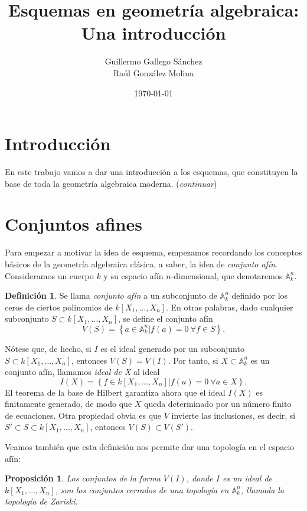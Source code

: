 \documentclass[12pt,a4paper]{article}
\title{ Esquemas en geometría algebraica: Una introducción}
\author{Guillermo Gallego Sánchez \\ Raúl González Molina}
\date{\today}
\newtheorem{prop}[thm]{Proposición}
\theoremstyle{definition} \newtheorem{defn}[thm]{Definición}
\theoremstyle{definition} \newtheorem{ejemplo}[thm]{Ejemplo}
\theoremstyle{definition} \newtheorem{ejercicio}[thm]{Ejercicio}
\theoremstyle{remark} \newtheorem*{obs}{Observación}
\def\AA{\mathbb{A}}
\begin{document}
\maketitle
\section*{Introducción}
En este trabajo vamos a dar una introducción a los esquemas, que constituyen la base de toda la geometría algebraica moderna. (\emph{continuar})
\section{Conjuntos afines}
Para empezar a motivar la idea de esquema, empezamos recordando los conceptos básicos de la geometría algebraica clásica, a saber, la idea de \emph{conjunto afín}. Consideramos un cuerpo $k$ y su espacio afín $n$-dimensional, que denotaremos $\AA_k^n$.
\begin{defn}
  Se llama \emph{conjunto afín} a un subconjunto de $\AA_k^n$ definido por los ceros de ciertos polinomios de $k[X_1,\dots,X_n]$. En otras palabras, dado cualquier subconjunto $S\subset k[X_1,\dots,X_n]$, se define el conjunto afín
  \begin{equation*}
    V(S)=\left\{ a\in \AA_k^n \vert f(a)=0 \ \forall f\in S \right\}.
  \end{equation*}
\end{defn}

Nótese que, de hecho, si $I$ es el ideal generado por un subconjunto $S\subset k[X_1,\dots,X_n]$, entonces $V(S)=V(I)$. Por tanto, si $X\subset \AA_k^n$ es un conjunto afín, llamamos \emph{ideal de X} al ideal
\begin{equation*}
  I(X)=\left\{ f\in k[X_1,\dots,X_n] | f(a)=0 \ \forall a \in X \right\}.
\end{equation*}
El teorema de la base de Hilbert garantiza ahora que el ideal $I(X)$ es finitamente generado, de modo que $X$ queda determinado por un número finito de ecuaciones. Otra propiedad obvia es que $V$ invierte las inclusiones, es decir, si $S' \subset S\subset k[X_1,\dots,X_n]$, entonces $V(S)\subset V(S')$. 

Veamos también que esta definición nos permite dar una topología en el espacio afín:
\begin{prop}
  Los conjuntos de la forma $V(I)$, donde $I$ es un ideal de $k[X_1,\dots,X_n]$, son los conjuntos cerrados de una topología en $\AA_k^n$, llamada la \emph{topología de Zariski}.
\end{prop}
\end{document}
